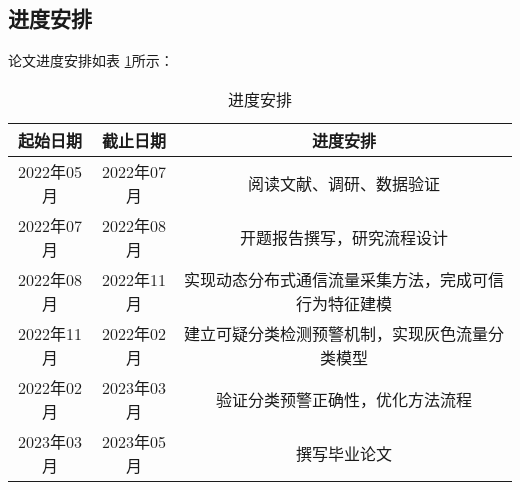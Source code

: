  
\subsection{进度安排}
论文进度安排如表 \ref{table:进度安排}所示：


\begin{table}[htbp]
	\centering
	\caption{进度安排}\label{table:进度安排}
	\vspace{0.5em}\wuhao
	\begin{tabular}{ccc}
		\toprule
		起始日期        & 截止日期     & 进度安排    \\
		\midrule
		2022年05月           & 2022年07月           & 阅读文献、调研、数据验证      \\
		2022年07月          & 2022年08月      & 开题报告撰写，研究流程设计  \\
		2022年08月         & 2022年11月        & 实现动态分布式通信流量采集方法，完成可信行为特征建模  \\
		2022年11月         & 2022年02月     & 建立可疑分类检测预警机制，实现灰色流量分类模型  \\
		2022年02月           & 2023年03月   & 验证分类预警正确性，优化方法流程 \\
		2023年03月          & 2023年05月     &      撰写毕业论文     \\


		\bottomrule
	\end{tabular}
\end{table}


\FloatBarrier




